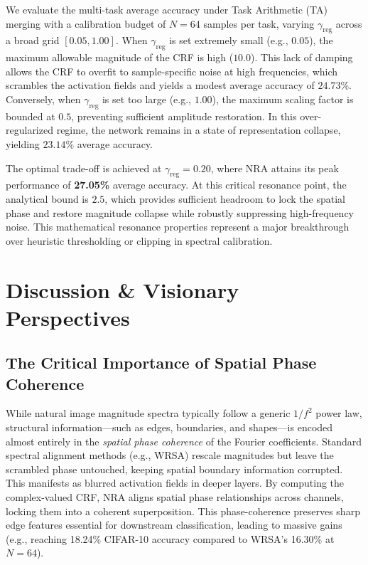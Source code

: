 \documentclass{article}
\theoremstyle{plain}
\theoremstyle{definition}
\theoremstyle{remark}
\begin{document}
We evaluate the multi-task average accuracy under Task Arithmetic (TA) merging with a calibration budget of \(N=64\) samples per task, varying \(\gamma_{\text{reg}}\) across a broad grid \([0.05, 1.00]\). When \(\gamma_{\text{reg}}\) is set extremely small (e.g., \(0.05\)), the maximum allowable magnitude of the CRF is high (\(10.0\)). This lack of damping allows the CRF to overfit to sample-specific noise at high frequencies, which scrambles the activation fields and yields a modest average accuracy of \(24.73\%\). Conversely, when \(\gamma_{\text{reg}}\) is set too large (e.g., \(1.00\)), the maximum scaling factor is bounded at \(0.5\), preventing sufficient amplitude restoration. In this over-regularized regime, the network remains in a state of representation collapse, yielding \(23.14\%\) average accuracy.

The optimal trade-off is achieved at \(\gamma_{\text{reg}} = 0.20\), where NRA attains its peak performance of \textbf{27.05\%} average accuracy. At this critical resonance point, the analytical bound is \(2.5\), which provides sufficient headroom to lock the spatial phase and restore magnitude collapse while robustly suppressing high-frequency noise. This mathematical resonance properties represent a major breakthrough over heuristic thresholding or clipping in spectral calibration.

\section{Discussion \& Visionary Perspectives}
\label{submission-discussion}
\subsection{The Critical Importance of Spatial Phase Coherence}
While natural image magnitude spectra typically follow a generic $1/f^2$ power law, structural information—such as edges, boundaries, and shapes—is encoded almost entirely in the \textit{spatial phase coherence} of the Fourier coefficients. Standard spectral alignment methods (e.g., WRSA) rescale magnitudes but leave the scrambled phase untouched, keeping spatial boundary information corrupted. This manifests as blurred activation fields in deeper layers. By computing the complex-valued CRF, NRA aligns spatial phase relationships across channels, locking them into a coherent superposition. This phase-coherence preserves sharp edge features essential for downstream classification, leading to massive gains (e.g., reaching 18.24\% CIFAR-10 accuracy compared to WRSA's 16.30\% at $N=64$).
\end{document}
